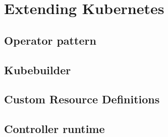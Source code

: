 \chapter{Extending Kubernetes}

\section{Operator pattern}

\section{Kubebuilder}

\section{Custom Resource Definitions}

\section{Controller runtime}
